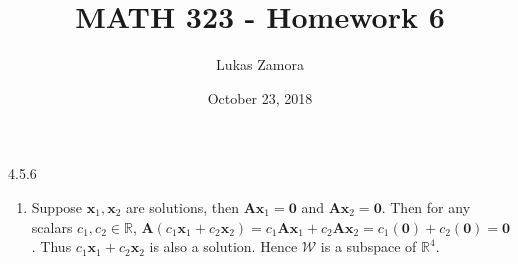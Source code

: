 \documentclass{article}
\title{MATH 323 - Homework 6}
\author{Lukas Zamora}
\date{October 23, 2018}
\theoremstyle{definition}
\begin{document}
    \maketitle

    \begin{prob}{4.5.6} $ $
        \begin{enumerate}[label=\alph*.)]
        	\item Suppose $ \mathbf{x}_1, \mathbf{x}_2 $ are solutions, then $ \mathbf{Ax}_1 = \mathbf{0} $ and $ \mathbf{Ax}_2 = \mathbf{0} $. Then for any scalars $ c_1, c_2 \in \mathbb{R} $, $ \mathbf{A}(c_1\mathbf{x}_1 + c_2\mathbf{x}_2) = c_1\mathbf{Ax}_1 + c_2\mathbf{Ax}_2 = c_1(\mathbf{0}) + c_2(\mathbf{0}) = \mathbf{0} $. Thus $ c_1\mathbf{x}_1 + c_2\mathbf{x}_2 $ is also a solution. Hence $ \mathcal{W} $ is a subspace of $ \mathbb{R}^4 $.
        	

\end{enumerate}
\end{prob}
\end{document}
